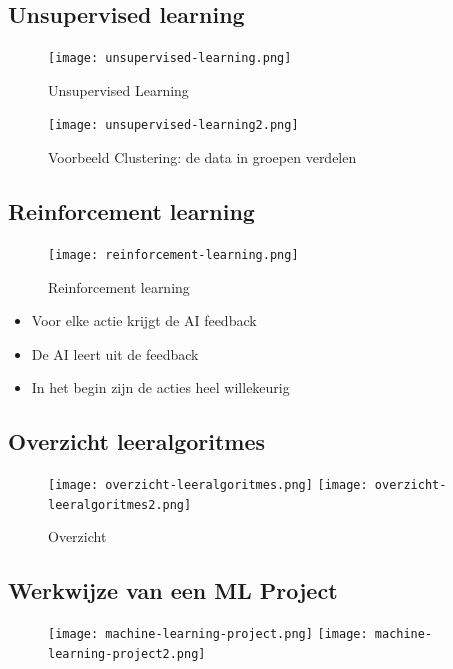 \documentclass{article}
\begin{document}
\subsection{Unsupervised learning}

\begin{figure}[H]
    \centering
    \texttt{[image: unsupervised-learning.png]}
    \caption{Unsupervised Learning}
\end{figure}

\begin{figure}[H]
    \centering
    \texttt{[image: unsupervised-learning2.png]}
    \caption{Voorbeeld Clustering: de data in groepen verdelen}
\end{figure}

\subsection{Reinforcement learning}

\begin{figure}[H]
    \centering
    \texttt{[image: reinforcement-learning.png]}
    \caption{Reinforcement learning}
\end{figure}

\begin{itemize}
    \item Voor elke actie krijgt de AI feedback
    \item De AI leert uit de feedback
    \item In het begin zijn de acties heel willekeurig
\end{itemize}

\subsection{Overzicht leeralgoritmes}

\begin{figure}[H]
    \centering
    \texttt{[image: overzicht-leeralgoritmes.png]}
    \texttt{[image: overzicht-leeralgoritmes2.png]}
    \caption{Overzicht}
\end{figure}

\subsection{Werkwijze van een ML Project}

\begin{figure}[H]
    \centering
    \texttt{[image: machine-learning-project.png]}
    \texttt{[image: machine-learning-project2.png]}
    \caption{}
\end{figure}
\end{document}

